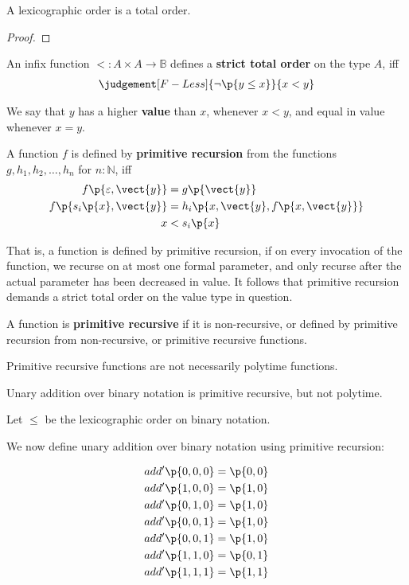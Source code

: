 \begin{theorem} A lexicographic order is a total order. \end{theorem}

\begin{proof} \end{proof}

\begin{definition} An infix function $<:A\times A \rightarrow \mathbb{B}$
defines a \textbf{strict total order} on the type $A$, iff 
\begin{align}
\judgement[F-Less]{\neg \p{y \leq x}}{x < y}
\end{align}
\end{definition} 

We say that $y$ has a higher \textbf{value} than $x$, whenever $x<y$, and equal
in value whenever $x=y$.

\begin{definition} A function $f$ is defined by \textbf{primitive recursion}
from the functions $g,h_1,h_2,\ldots,h_n$ for $n:\mathbb{N}$, iff
\begin{align}
f\p{\varepsilon, \vect{y}} &= g\p{\vect{y}} \\
f\p{s_i\p{x}, \vect{y}} &= h_i\p{x,\vect{y},f\p{x,\vect{y}}} \\
x &< s_i\p{x}
\end{align}
\end{definition}

That is, a function is defined by primitive recursion, if on every invocation
of the function, we recurse on at most one formal parameter, and only recurse
after the actual parameter has been decreased in value. It follows that
primitive recursion demands a strict total order on the value type in question.

\begin{definition} A function is \textbf{primitive recursive} if it is
non-recursive, or defined by primitive recursion from non-recursive, or
primitive recursive functions.  \end{definition}

Primitive recursive functions are not necessarily polytime functions.

\begin{example}
Unary addition over binary notation is primitive recursive, but not polytime.

Let $\leq$ be the lexicographic order on binary notation.

We now define unary addition over binary notation using primitive recursion:

\begin{align}
add'\p{0,0,0} = \p{0,0} \\
add'\p{1,0,0} = \p{1,0} \\
add'\p{0,1,0} = \p{1,0} \\
add'\p{0,0,1} = \p{1,0} \\
add'\p{0,0,1} = \p{1,0} \\
add'\p{1,1,0} = \p{0,1} \\
add'\p{1,1,1} = \p{1,1}
\end{align}

\end{example}
